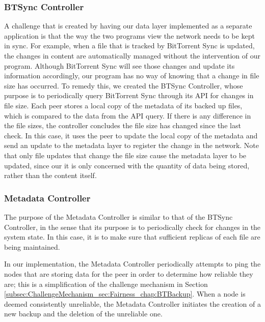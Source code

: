 \documentclass[12pt]{report}
\begin{document}
\subsubsection{BTSync Controller} \label{subsubsec:BTSyncController_subsec:SystemCore_sec:SystemDesign_chap:Implementation}
A challenge that is created by having our data layer implemented as a separate application is that the way the two programs view the network needs to be kept in sync. For example, when a file that is tracked by BitTorrent Sync is updated, the changes in content are automatically managed without the intervention of our program. Although BitTorrent Sync will see those changes and update its information accordingly, our program has no way of knowing that a change in file size has occurred. To remedy this, we created the BTSync Controller, whose purpose is to periodically query BitTorrent Sync through its API for changes in file size. Each peer stores a local copy of the metadata of its backed up files, which is compared to the data from the API query. If there is any difference in the file sizes, the controller concludes the file size has changed since the last check. In this case, it uses the peer to update the local copy of the metadata and send an update to the metadata layer to register the change in the network. Note that only file updates that change the file size cause the metadata layer to be updated, since our it is only concerned with the quantity of data being stored, rather than the content itself.

\subsubsection{Metadata Controller} \label{subsubsec:MetadataController_subsec:SystemCore_sec:SystemDesign_chap:Implementation}
The purpose of the Metadata Controller is similar to that of the BTSync Controller, in the sense that its purpose is to periodically check for changes in the system state. In this case, it is to make sure that sufficient replicas of each file are being maintained.

In our implementation, the Metadata Controller periodically attempts to ping the nodes that are storing data for the peer in order to determine how reliable they are; this is a simplification of the challenge mechanism in Section \ref{subsec:ChallengeMechanism_sec:Fairness_chap:BTBackup}. When a node is deemed consistently unreliable, the Metadata Controller initiates the creation of a new backup and the deletion of the unreliable one.
\end{document}
